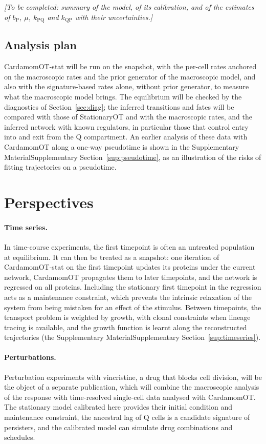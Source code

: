 \documentclass[a4paper, 11pt]{article}
\newcommand{\cP}{\mathrm{P}}
\newcommand{\cQ}{\mathrm{Q}}
\newcommand{\tofill}[1]{\par\smallskip\noindent\emph{[To be completed: #1]}\par\smallskip}
\newcommand{\supref}[1]{\ifsimplified the Supplementary Material\else Supplementary Section~\ref{#1}\fi}
\theoremstyle{plain}
\theoremstyle{remark}
\begin{document}
\tofill{summary of the model, of its calibration, and of the estimates of $b_\cP$, $\mu$, $k_{\cP\cQ}$ and $k_{\cQ\cP}$ with their uncertainties.}

\subsection{Analysis plan}

CardamomOT-stat will be run on the snapshot, with the per-cell rates anchored on the macroscopic rates and the prior generator of the macroscopic model, and also with the signature-based rates alone, without prior generator, to measure what the macroscopic model brings. The equilibrium will be checked by the diagnostics of Section~\ref{sec:diag}; the inferred transitions and fates will be compared with those of StationaryOT and with the macroscopic rates, and the inferred network with known regulators, in particular those that control entry into and exit from the $\cQ$ compartment. An earlier analysis of these data with CardamomOT along a one-way pseudotime is shown in \supref{sup:pseudotime}, as an illustration of the risks of fitting trajectories on a pseudotime.

\section{Perspectives}\label{sec:persp}

\paragraph{Time series.} In time-course experiments, the first timepoint is often an untreated population at equilibrium. It can then be treated as a snapshot: one iteration of CardamomOT-stat on the first timepoint updates its proteins under the current network, CardamomOT propagates them to later timepoints, and the network is regressed on all proteins. Including the stationary first timepoint in the regression acts as a maintenance constraint, which prevents the intrinsic relaxation of the system from being mistaken for an effect of the stimulus. Between timepoints, the transport problem is weighted by growth, with clonal constraints when lineage tracing is available, and the growth function is learnt along the reconstructed trajectories (\supref{sup:timeseries}).

\paragraph{Perturbations.} Perturbation experiments with vincristine, a drug that blocks cell division, will be the object of a separate publication, which will combine the macroscopic analysis of the response with time-resolved single-cell data analysed with CardamomOT. The stationary model calibrated here provides their initial condition and maintenance constraint, the ancestral lag of $\cQ$ cells is a candidate signature of persisters, and the calibrated model can simulate drug combinations and schedules.
\end{document}
